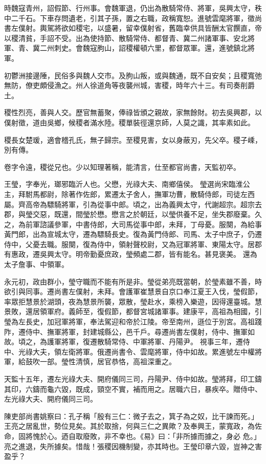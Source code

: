 \begin{pinyinscope}
 時魏寇青州，詔假節、行州事。會魏軍退，仍出為散騎常侍、將軍，吳興太守，秩中二千石。下車存問遺老，引其子孫，置之右職，政稱寬恕。進號雲麾將軍，徵尚書左僕射。輿駕將欲如稷宅，以盛暑，留幸僕射省，舊臨幸供具皆酬太官饌直，帝以稷清貧，手詔不受。出為使持節、散騎常侍、都督青、冀二州諸軍事、安北將軍、青、冀二州刺史。會魏寇朐山，詔稷權頓六里，都督眾軍。還，進號鎮北將軍。



 初鬱洲接邊陲，民俗多與魏人交市。及朐山叛，或與魏通，既不自安矣；且稷寬弛無防，僚吏頗侵漁之。州人徐道角等夜襲州城，害稷，時年六十三。有司奏削爵土。



 稷性烈亮，善與人交。歷官無蓄聚，俸祿皆頒之親故，家無餘財。初去吳興郡，以僕射徵，道由吳鄉，候稷者滿水陸。稷單裝徑還京師，人莫之識，其率素如此。



 稷長女楚瑗，適會稽孔氏，無子歸宗。至稷見害，女以身蔽刃，先父卒。稷子嵊，別有傳。



 卷字令遠，稷從兄也。少以知理著稱，能清言，仕至都官尚書，天監初卒。



 王瑩，字奉光，瑯邪臨沂人也。父懋，光祿大夫、南鄉僖侯。
 瑩選尚宋臨淮公主，拜駙馬都尉，除著作佐郎，累遷太子舍人，撫軍功曹，散騎侍郎，司徒左西屬。齊高帝為驃騎將軍，引為從事中郎。頃之，出為義興太守，代謝超宗。超宗去郡，與瑩交惡，既還，間瑩於懋。懋言之於朝廷，以瑩供養不足，坐失郡廢棄。久之，為前軍諮議參軍，中書侍郎，大司馬從事中郎，未拜，丁母憂。服闋，為給事黃門郎，出為宣城太守，遷為驃騎長史。復為黃門侍郎、司馬、太子中庶子，仍遷侍中，父憂去職。服闋，復為侍中，領射聲校尉，又為冠軍將軍、東陽太守。居郡有惠政，遷吳興太守。明帝勤憂庶政，瑩頻處二郡，皆有能名。甚見褒美。
 還為太子詹事、中領軍。



 永元初，政由群小，瑩守職而不能有所是非。瑩從弟亮既當朝，於瑩素雖不善，時欲引與同事。遷尚書左僕射，未拜。會護軍崔慧景自京口奉江夏王入伐，瑩假節，率眾拒慧景於湖頭，夜為慧景所襲，眾散，瑩赴水，乘榜入樂遊，因得還臺城。慧景敗，還居領軍府。義師至，復假節，都督宮城諸軍事。建康平，高祖為相國，引瑩為左長史，加冠軍將軍，奉法駕迎和帝於江陵。帝至南州，遜位于別宮。高祖踐阼，遷侍中、撫軍將軍，封建城縣公，邑千戶。尋遷尚書左僕射，侍中、撫軍如故。頃之，為護軍將軍，復遷散騎常侍、中軍將軍、丹陽尹。
 視事三年，遷侍中、光祿大夫，領左衛將軍。俄遷尚書令、雲麾將軍，侍中如故。累進號左中權將軍，給鼓吹一部。瑩性清慎，居官恭恪，高祖深重之。



 天監十五年，遷左光祿大夫、開府儀同三司，丹陽尹、侍中如故。瑩將拜，印工鑄其印，六鑄而龜六毀，既成，頸空不實，補而用之。居職六日，暴疾卒。贈侍中、左光祿大夫、開府儀同三司。



 陳吏部尚書姚察曰：孔子稱「殷有三仁：微子去之，箕子為之奴，比干諫而死。」王亮之居亂世，勢位見矣。其於取捨，何與三仁之異歟？及奉興王，蒙寬政，為佐命，固將愧於心。迺自取廢敗，非不幸也。《易》曰：「非所據而據之，身必
 危。」亮之進退，失所據矣。惜哉！張稷因機制變，亦其時也。王瑩印章六毀，豈神之害盈乎？



\end{pinyinscope}